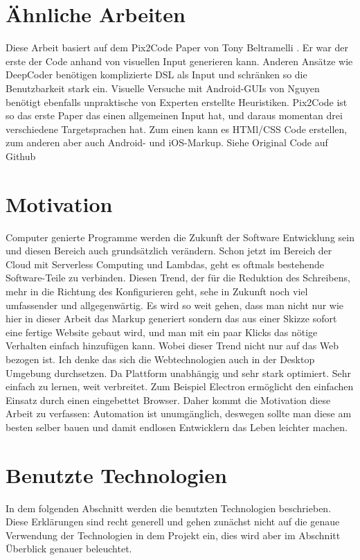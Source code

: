 \documentclass[pdftex,a4paper,halfparskip, article]{scrartcl}
\begin{document}
\section{Ähnliche Arbeiten}

Diese Arbeit basiert auf dem Pix2Code Paper von Tony Beltramelli \cite{Beltramelli17} . Er war der erste der Code anhand von visuellen Input generieren kann. 
Anderen Ansätze wie DeepCoder \cite{DeepCoder16} benötigen komplizierte DSL als Input und schränken so die Benutzbarkeit stark ein. Visuelle Versuche mit Android-GUIs von Nguyen \cite{Nguyen15} benötigt ebenfalls unpraktische von Experten erstellte Heuristiken. Pix2Code ist so das erste Paper das einen allgemeinen Input hat, und daraus momentan drei verschiedene Targetsprachen hat. Zum einen kann es HTMl/CSS Code erstellen, zum anderen aber auch Android- und iOS-Markup. Siehe Original Code auf Github \cite{Beltramelli17Github}


\section{Motivation}
Computer genierte Programme werden die Zukunft der Software Entwicklung sein und diesen Bereich auch grundsätzlich verändern. Schon jetzt im Bereich der Cloud mit Serverless Computing und Lambdas, geht es oftmals bestehende Software-Teile zu verbinden. Diesen Trend, der für die Reduktion des Schreibens, mehr in die Richtung des Konfigurieren geht, sehe in Zukunft noch viel umfassender und allgegenwärtig. Es wird so weit gehen, dass man nicht nur wie hier in dieser Arbeit das Markup generiert sondern das aus einer Skizze sofort eine fertige Website gebaut wird, und man mit ein paar Klicks das nötige Verhalten einfach hinzufügen kann. 
Wobei dieser Trend nicht nur auf das Web bezogen ist. Ich denke das sich die Webtechnologien auch in der Desktop Umgebung durchsetzen.  Da Plattform unabhängig und sehr stark optimiert. Sehr einfach zu lernen, weit verbreitet. Zum Beispiel Electron \cite{electron} ermöglicht den einfachen Einsatz durch einen eingebettet Browser.
Daher kommt die Motivation diese Arbeit zu verfassen: Automation ist unumgänglich, deswegen sollte man diese am besten selber bauen und damit endlosen Entwicklern das Leben leichter machen.

\section{Benutzte Technologien}

In dem folgenden Abschnitt werden die benutzten Technologien beschrieben. Diese Erklärungen sind recht generell und gehen zunächst nicht auf die genaue Verwendung der Technologien in dem Projekt ein, dies wird aber im Abschnitt Überblick genauer beleuchtet.
\end{document}
